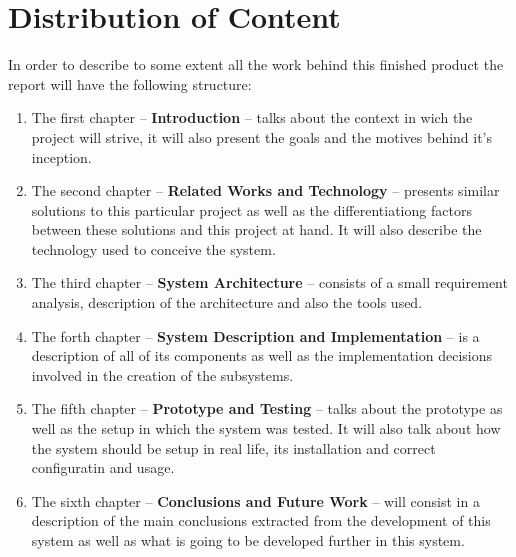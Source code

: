 \section{Distribution of Content}
\label{sec:organ}
In order to describe to some extent all the work behind this finished product
the report will have the following structure:
\begin{enumerate}
	\item The first chapter -- \textbf{Introduction} -- talks about the context
		in wich the project will strive, it will also present the goals and the
		motives behind it's inception.
	\item The second chapter -- \textbf{Related Works and Technology} --
		presents similar solutions to this particular project as well as the
		differentiationg factors between these solutions and this project at
		hand. It will also describe the technology used to conceive the system.
	\item The third chapter -- \textbf{System Architecture} -- consists of a
		small requirement analysis, description of the architecture and also the
		tools used.
	\item The forth chapter -- \textbf{System Description and Implementation} --
		is a description of all of its components as well as the implementation
		decisions involved in the creation of the subsystems.
	\item The fifth chapter -- \textbf{Prototype and Testing} -- talks about the
		prototype as well as the setup in which the system was tested. It will
		also talk about how the system should be setup in real life, its
		installation and correct configuratin and usage.
	\item The sixth chapter -- \textbf{Conclusions and Future Work} -- will
		consist in a description of the main conclusions extracted from the
		development of this system as well as what is going to be developed
		further in this system.
\end{enumerate}

